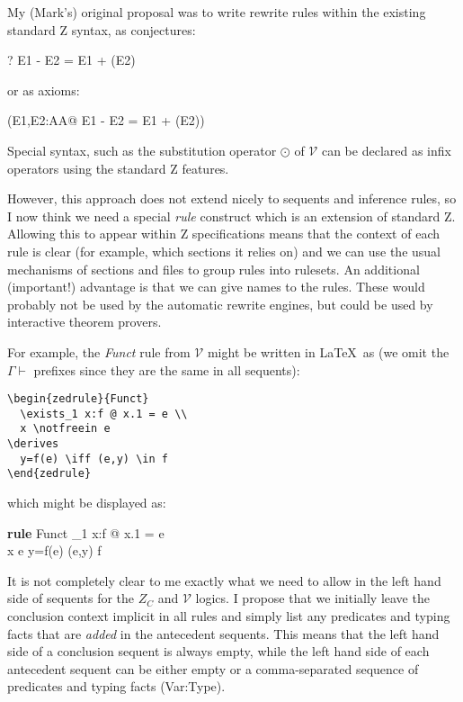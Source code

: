 \documentclass{article}
\newcommand{\V}{\mathcal{V}}
\newenvironment{zedrule}[1]{\par\textbf{rule }#1\vspace{-2ex}\infrule}{\endinfrule}
\newcommand{\derives}{\derive{}}
\newcommand{\notfreein}{\mathbin{\backslash}}
\newcommand{\negate}{\mathop{-}}
\newcommand{\arithmos}{{A\!\!\!\!A}}   %
\begin{document}
My (Mark's) original proposal was to write rewrite rules within the
existing standard Z syntax, as conjectures:
\begin{zed}
  \vdash? E1 - E2 = E1 + (\negate E2)
\end{zed}
or as axioms:
\begin{axdef}
\where
  (\forall E1,E2:\arithmos @ E1 - E2 = E1 + (\negate E2))
\end{axdef}
Special syntax, such as the substitution operator $\odot$ of $\mathcal{V}$
can be declared as infix operators using the standard Z features.

However, this approach does not extend nicely to sequents and
inference rules, so I now think we need a special \emph{rule} construct
which is an extension of standard Z.  Allowing this to appear within
Z specifications means that the context of each rule is clear
(for example, which sections it relies on) and we can use the usual
mechanisms of sections and files to group rules into rulesets.
An additional (important!) advantage is that we can give names
to the rules.  These would probably not be used by the automatic rewrite
engines, but could be used by interactive theorem provers.

For example, the \emph{Funct} rule from $\mathcal{V}$ might be
written in \LaTeX\ as (we omit the $\Gamma \vdash$ prefixes
since they are the same in all sequents):
\begin{verbatim}
\begin{zedrule}{Funct}
  \exists_1 x:f @ x.1 = e \\
  x \notfreein e
\derives
  y=f(e) \iff (e,y) \in f
\end{zedrule}
\end{verbatim}

which might be displayed as:
\begin{zedrule}{Funct}
  \exists_1 x:f @ x.1 = e \\
  x \notfreein e
\derives
  y=f(e) \iff (e,y) \in f
\end{zedrule}

It is not completely clear to me exactly what we need to
allow in the left hand side of sequents for the $Z_C$ and $\V$
logics.  I propose that we initially leave the conclusion context implicit
in all rules and simply list any predicates and typing facts that
are \emph{added} in the antecedent sequents.  This means that the
left hand side of a conclusion sequent is always empty, while the
left hand side of each antecedent sequent can be either empty or
a comma-separated sequence of predicates and typing facts (Var:Type).
\end{document}
